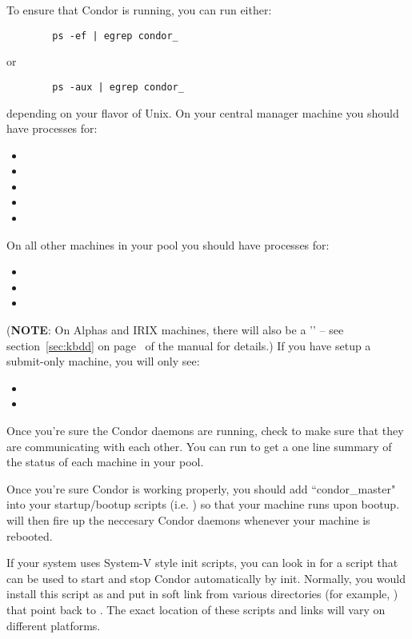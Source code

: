 To ensure that Condor is running, you can run either:
\begin{verbatim}
        ps -ef | egrep condor_
\end{verbatim}
or
\begin{verbatim}
        ps -aux | egrep condor_
\end{verbatim}
depending on your flavor of Unix.  On your central manager machine you
should have processes for:
\begin{itemize}
	\item {}
	\item {}
	\item {}
	\item {}
	\item {}
\end{itemize}
On all other machines in your pool you should have processes for:
\begin{itemize}
	\item {}
	\item {}
	\item {}
\end{itemize}
(\textbf{NOTE}: On Alphas and IRIX machines, there will also be a
	'' -- see section~\ref{sec:kbdd} on
	page~\pageref{sec:kbdd} of the manual for details.)  If you
	have setup a submit-only machine, you will only see:
\begin{itemize}
	\item {}
	\item {}
\end{itemize}

Once you're sure the Condor daemons are running, check to make sure
that they are communicating with each other.  You can run
 to get a one line summary of the status of each
machine in your pool.

Once you're sure Condor is working properly, you should add
``condor\_master" into your startup/bootup scripts (i.e.  ) so
that your machine runs  upon bootup.  
will then fire up the neccesary Condor daemons whenever your machine
is rebooted.  

If your system uses System-V style init scripts, you can look in
 for a script that can be used
to start and stop Condor automatically by init.  Normally, you would
install this script as  and put in soft link from
various directories (for example, ) that point back to
.  The exact location of these scripts and links
will vary on different platforms.

